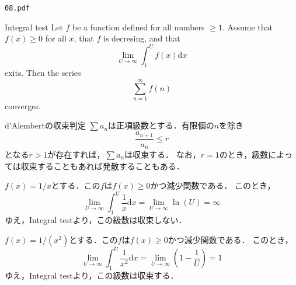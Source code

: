 \documentclass[uplatex,11pt]{jsarticle}
\newcommand{\bibun}{\mathrm{d}}
\def\shoumon#1{\vspace{1em}\noindent\ovalbox{\textsf{ #1 }}}
\begin{document}
\begin{shadebox}
	\begin{center}
		\texttt{08.pdf}
	\end{center}
\end{shadebox}
\vspace{5mm}

\begin{irohako}[ForestGreen]{Integral test{\footnotemark}}
	Let $f$ be a function defined for all numbers $\geq 1$.
	Assume that $f(x) \geq 0$ for all $x$, that $f$ is decresing, and that
	\begin{equation*}
		\lim_{U\rightarrow\infty}
		\int_1^U f(x) \bibun x
	\end{equation*}
	exits.
	Then the series
	\begin{equation*}
		\sum_{n=1}^\infty f(n)
	\end{equation*}
	converges.
\end{irohako}

\begin{irohako}[blue]{d'Alembertの収束判定{\footnotemark}}
	$\sum a_n$は正項級数とする．有限個の$n$を除き
	\begin{equation*}
		\frac{a_{n+1}}{a_n} \leq r
	\end{equation*}
	となる$r>1$が存在すれば，$\sum a_n$は収束する．
	なお，$r=1$のとき，級数によっては収束することもあれば発散することもある．
\end{irohako}

\newpage
\shoumon{(1)}

$f(x)=1/x$とする．この$f$は$f(x)\geq 0$かつ減少関数である．
このとき，
\begin{equation*}
	\lim_{U\rightarrow\infty}
	\int_1^U \frac{1}{x} \bibun x
	=
	\lim_{U\rightarrow\infty}
	\ln (U)
	=
	\infty
\end{equation*}
ゆえ，\textsf{Integral test}より，この級数は収束しない．


\shoumon{(2)}

$f(x)=1/(x^2)$とする．この$f$は$f(x)\geq 0$かつ減少関数である．
このとき，
\begin{equation*}
	\lim_{U\rightarrow\infty}
	\int_1^U \frac{1}{x^2} \bibun x
	=
	\lim_{U\rightarrow\infty}
	\left(1-\frac{1}{U}\right)
	=
	1
\end{equation*}
ゆえ，\textsf{Integral test}より，この級数は収束する．


\shoumon{(3)}
\end{document}
